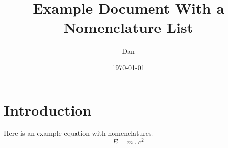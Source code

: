\documentclass[11pt]{article}
\title{Example Document With a Nomenclature List}
\author{Dan}
\date{\today}
\begin{document}
\maketitle
\section{Introduction}
Here is an example equation with nomenclatures:
\begin{equation}
  E = m\:.\:c^2
\end{equation}
%
%
%

\printglossary
\end{document}
